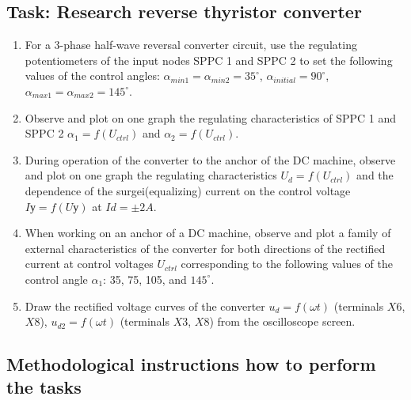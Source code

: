 \documentclass[a4paper,14pt]{article}
\begin{document}
\subsection{Task: Research reverse thyristor converter}

\begin{enumerate}[label=\emph{\arabic*}. , ref=\emph{\thesubsection.\arabic*}, leftmargin=0pt, labelindent=\parindent]

\item \label{taskII:itm1}For a 3-phase half-wave reversal converter circuit, use the regulating potentiometers of the input nodes SPPC 1 and SPPC 2 to set the following values of the control angles: $\alpha_{min1} = \alpha_{min2} =  35^\circ$,
$\alpha_{initial} = 90^\circ$, $\alpha_{max1} = \alpha_{max2} = 145^\circ$.

\item\label{taskII:itm2} Observe and plot on one graph the regulating characteristics of SPPC 1 and SPPC 2 $\alpha_1= f (U_{ctrl})$ 
and $\alpha_2 = f (U_{ctrl})$.

\item\label{taskII:itm3} During operation of the converter to the anchor of the DC machine, observe and plot on one graph 
the regulating characteristics $U_d = f (U_{ctrl})$ and the dependence of the surgei(equalizing) current 
on the control voltage $Iу = f (Uу)$ at $Id = \pm 2A$.

\item\label{taskII:itm4} When working on an anchor of a DC machine, observe and plot a family of external characteristics of the converter 
for both directions of the rectified current at control voltages $U_{ctrl}$ corresponding to the following values 
of the control angle $\alpha_1$:  35, 75, 105, and $145^\circ$.


\item\label{taskII:itm5} Draw the rectified voltage curves of the converter 
$u_d = f (\omega t)$ (terminals $X6$, $X8$), $u_{d2} = f (\omega t)$ (terminals $X3$, $X8$) from the oscilloscope screen.
\end{enumerate}

\subsection{Methodological instructions how to perform the tasks}
\end{document}
